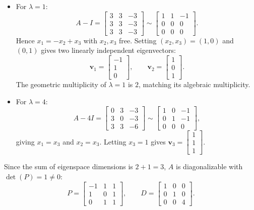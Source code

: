 \documentclass[11pt, letterpaper]{article}
\theoremstyle{definition}
\theoremstyle{remark}
\begin{document}
\begin{itemize}
    \item For $\lambda = 1$:
    \[
    A - I = \begin{bmatrix} 3 & 3 & -3 \\ 3 & 3 & -3 \\ 3 & 3 & -3 \end{bmatrix} \sim \begin{bmatrix} 1 & 1 & -1 \\ 0 & 0 & 0 \\ 0 & 0 & 0 \end{bmatrix}.
    \]
    Hence $x_{1} = -x_{2} + x_{3}$ with $x_{2}, x_{3}$ free. Setting $(x_{2}, x_{3}) = (1, 0)$ and $(0, 1)$ gives two linearly independent eigenvectors:
    \[
    \mathbf{v}_{1} = \begin{bmatrix} -1 \\ 1 \\ 0 \end{bmatrix}, \qquad \mathbf{v}_{2} = \begin{bmatrix} 1 \\ 0 \\ 1 \end{bmatrix}.
    \]
    The geometric multiplicity of $\lambda = 1$ is $2$, matching its algebraic multiplicity.
    \item For $\lambda = 4$:
    \[
    A - 4I = \begin{bmatrix} 0 & 3 & -3 \\ 3 & 0 & -3 \\ 3 & 3 & -6 \end{bmatrix} \sim \begin{bmatrix} 1 & 0 & -1 \\ 0 & 1 & -1 \\ 0 & 0 & 0 \end{bmatrix},
    \]
    giving $x_{1} = x_{3}$ and $x_{2} = x_{3}$. Letting $x_{3} = 1$ gives $\mathbf{v}_{3} = \begin{bmatrix} 1 \\ 1 \\ 1 \end{bmatrix}$.
\end{itemize}
Since the sum of eigenspace dimensions is $2 + 1 = 3$, $A$ is diagonalizable with $\det(P) = 1 \neq 0$:
\[
P = \begin{bmatrix} -1 & 1 & 1 \\ 1 & 0 & 1 \\ 0 & 1 & 1 \end{bmatrix}, \qquad D = \begin{bmatrix} 1 & 0 & 0 \\ 0 & 1 & 0 \\ 0 & 0 & 4 \end{bmatrix}.
\]
\end{document}
